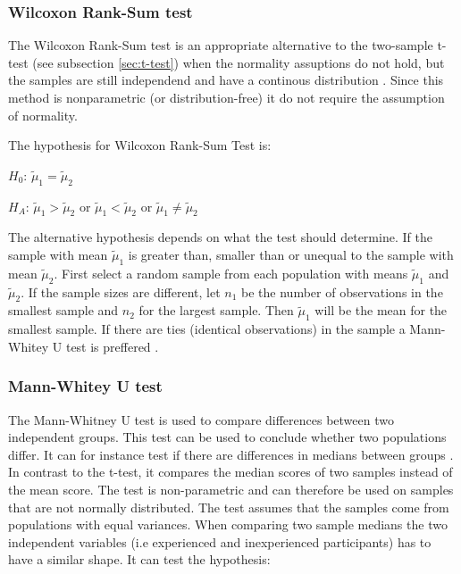\subsubsection[Wilcoxon]{Wilcoxon Rank-Sum test}\label{sec:Wilcoxon}
The Wilcoxon Rank-Sum test is an appropriate alternative to the two-sample t-test (see subsection \ref{sec:t-test}) when the normality assuptions do not hold, but the samples are still independend and have a continous distribution \citep{Walpole2012}. Since this method is nonparametric (or distribution-free) it do not require the assumption of normality. 

The hypothesis for Wilcoxon Rank-Sum Test is:\newline

\centerline{$H_{0}$:  $\tilde{\mu}_{1} =  \tilde{\mu}_{2} $} 
\centerline{$H_{A}$: $\tilde{\mu}_{1} >  \tilde{\mu}_{2} $ or $\tilde{\mu}_{1} <  \tilde{\mu}_{2} $ or $\tilde{\mu}_{1} \neq  \tilde{\mu}_{2} $}

The alternative hypothesis depends on what the test should determine. If the sample with mean $\tilde{\mu}_1$ is greater than, smaller than or unequal to the sample with mean $\tilde{\mu}_2$.  First select a random sample from each population with means $\tilde{\mu}_{1} $ and $ \tilde{\mu}_{2} $. If the sample sizes are different, let $n_{1}$ be the number of observations in the smallest sample and $n_{2}$ for the largest sample. Then $\tilde{\mu}_1$ will be the mean for the smallest sample. If there are ties (identical observations) in the sample a Mann-Whitey U test is preffered \citep{TheScipycommunity2017}. 

\subsubsection{Mann-Whitey U test}\label{sec:mannwhiteyu}
The Mann-Whitney U test is used to compare differences between two independent groups. This test can be used to conclude whether two populations differ. It can for instance test if there are differences in medians between groups \citep{LundResearchLtd2013b}. In contrast to the t-test, it compares the median scores of two samples instead of the mean score. The test is non-parametric and can therefore be used on samples that are not normally distributed. The test assumes that the samples come from populations with equal variances. When comparing two sample medians the two independent variables (i.e experienced and inexperienced participants) has to have a similar shape. It can test the hypothesis: \\

